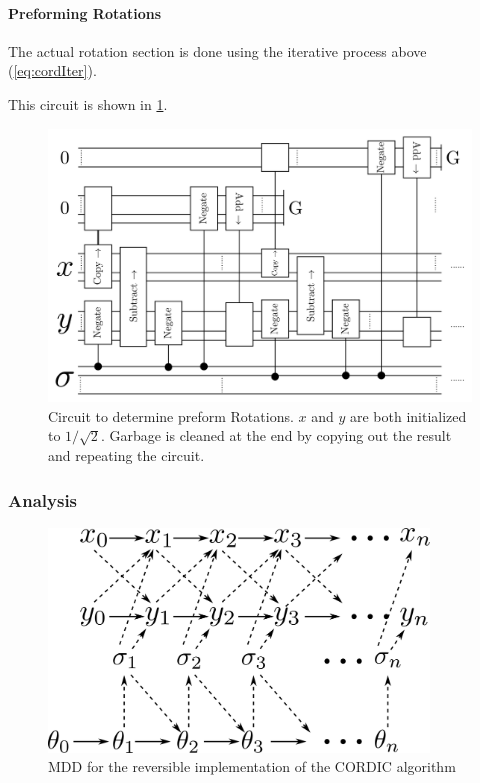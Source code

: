         \paragraph{Preforming Rotations}
            The actual rotation section is done using the iterative process above (\cref{eq:cordIter}).

            This circuit is shown in \cref{fig:CORDICRotations}.
            \begin{figure}
                \capstart
                \centering
                \includegraphics[width=\textwidth]{images/CORDICRotations}
                \caption{Circuit to determine preform Rotations.
                         $x$ and $y$ are both initialized to $1/\sqrt{2}$.
                         Garbage is cleaned at the end by copying out the result and repeating the circuit.}
                \label{fig:CORDICRotations}
            \end{figure}
        \subsubsection{Analysis}
	\begin{figure}
                \capstart
                \centering
                \includegraphics[width=0.9\textwidth]{images/CordicMDD}
                \caption{MDD for the reversible implementation of the CORDIC algorithm}
                \label{fig:CordicMDD}
        \end{figure}

